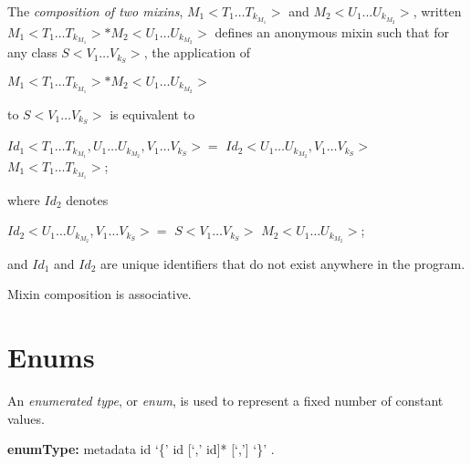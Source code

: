 \documentclass{article}
\begin{document}
\LMHash{}
The {\em composition of two mixins}, $M_1<T_1 \ldots T_{k_{M_1}}>$ and $M_2<U_1  \ldots U_{k_{M_2}}>$, written $M_1<T_1 \ldots T_{k_{M_1}}> * M_2<U_1  \ldots U_{k_{M_2}}>$ defines an anonymous mixin such that for any class $S<V_1 \ldots V_{k_S}>$, the application of 

$M_1<T_1 \ldots T_{k_{M_1}}> * M_2<U_1  \ldots U_{k_{M_2}}>$  

to $S<V_1 \ldots V_{k_S}>$ is equivalent to 

\begin{dartCode}
\ABSTRACT{} \CLASS{} $Id_1<T_1  \ldots T_{k_{M_1}}, U_1  \ldots U_{k_{M_2}}, V_1  \ldots V_{k_S}> = $
      $Id_2<U_1  \ldots U_{k_{M_2}}, V_1  \ldots V_{k_S}>$ \WITH{} $M_1 <T_1  \ldots T_{k_{M_1}}>$;
\end{dartCode}

where $Id_2$ denotes 

\begin{dartCode}
\ABSTRACT{}  \CLASS{} $Id_2<U_1 \ldots U_{k_{M_2}}, V_1 \ldots V_{k_S}> =$
                         $S<V_1 \ldots V_{k_S}>$ \WITH{} $M_2<U_1  \ldots U_{k_{M_2}}>$; 
\end{dartCode}

and $Id_1$ and $Id_2$ are unique identifiers that do not exist anywhere in the program. 


\LMHash{}
Mixin composition is associative.




\section{Enums}

\LMHash{}
An {\em enumerated type}, or {\em enum}, is used to represent a fixed number of constant values.

\begin{grammar}
{\bf enumType:}
metadata \ENUM{} id `\{' id [`,' id]* [`,'] `\}'
    .
\end{grammar}
\end{document}
